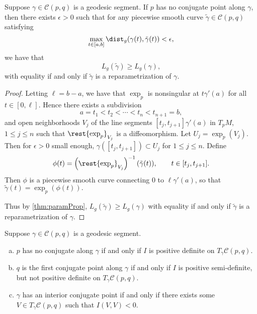 \begin{thm}
    Suppose $\gamma\in\mathcal{C}(p,q)$ is a geodesic segment.  If $p$ has no conjugate point along $\gamma$, then there exists $\epsilon>0$ such that for any piecewise smooth curve $\tilde{\gamma}\in\mathcal{C}(p,q)$ satisfying
    	$$\max_{t\in[a,b]}\dist_g(\gamma(t),\tilde{\gamma}(t))<\epsilon,$$
    	we have that
    	$$L_g(\tilde{\gamma})\geq L_g(\gamma),$$
    	with equality if and only if $\tilde{\gamma}$ is a reparametrization of $\gamma$.
    
\end{thm}

\begin{proof}
Letting $\ell=b-a$, we have that $\exp_p$ is nonsingular at $t\gamma'(a)$ for all $t\in[0,\ell]$.  Hence there exists a subdivision
$$a=t_1<t_2<\cdots<t_n<t_{n+1}=b,$$
and open neighborhoods $V_j$ of the line segments $[t_j,t_{j+1}]\gamma'(a)$ in $T_pM$, $1\leq j\leq n$ such that $\rest{\exp_p}_{V_j}$ is a diffeomorphism.  Let $U_j=\exp_p(V_j)$.  Then for $\epsilon>0$ small enough, $\gamma([t_j,t_{j+1}])\subset U_j$ for $1\leq j\leq n$.  Define
$$\phi(t)=\left(\rest{\exp_p}_{V_j}\right)^{-1}(\tilde{\gamma}(t)),\qquad t\in[t_j,t_{j+1}].$$
Then $\phi$ is a piecewise smooth curve connecting $0$ to $\ell\gamma'(a)$, so that $\tilde{\gamma}(t)=\exp_p(\phi(t)).$

Thus by \cref{thm:paramProp}, $L_g(\tilde{\gamma})\geq L_g(\gamma)$ with equality if and only if $\tilde{\gamma}$ is a reparametrization of $\gamma$.
\end{proof}


\begin{thm}\label{thm:jacobi}
    Suppose $\gamma\in\mathcal{C}(p,q)$ is a geodesic segment.
    
    \begin{enumerate}[a.]
    \item $p$ has no conjugate along $\gamma$ if and only if $I$ is positive definite on $T_\gamma\mathcal{C}(p,q)$.
    \item $q$ is the first conjugate point along $\gamma$ if and only if $I$ is positive semi-definite, but not positive definite on $T_\gamma\mathcal{C}(p,q)$.
    \item $\gamma$ has an interior conjugate point if and only if there exists some $V\in T_\gamma\mathcal{C}(p,q)$ such that $I(V,V)<0$.
    \end{enumerate}
\end{thm}

